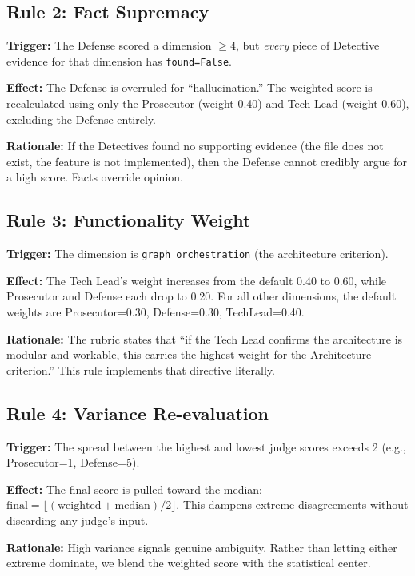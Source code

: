 \documentclass[12pt,a4paper]{article}
\begin{document}
\subsection{Rule 2: Fact Supremacy}

\textbf{Trigger:} The Defense scored a dimension $\geq 4$, but \emph{every} piece of Detective evidence for that dimension has \texttt{found=False}.

\textbf{Effect:} The Defense is overruled for ``hallucination.'' The weighted score is recalculated using only the Prosecutor (weight 0.40) and Tech Lead (weight 0.60), excluding the Defense entirely.

\textbf{Rationale:} If the Detectives found no supporting evidence (the file does not exist, the feature is not implemented), then the Defense cannot credibly argue for a high score. Facts override opinion.

\subsection{Rule 3: Functionality Weight}

\textbf{Trigger:} The dimension is \texttt{graph\_orchestration} (the architecture criterion).

\textbf{Effect:} The Tech Lead's weight increases from the default 0.40 to 0.60, while Prosecutor and Defense each drop to 0.20. For all other dimensions, the default weights are Prosecutor=0.30, Defense=0.30, TechLead=0.40.

\textbf{Rationale:} The rubric states that ``if the Tech Lead confirms the architecture is modular and workable, this carries the highest weight for the Architecture criterion.'' This rule implements that directive literally.

\subsection{Rule 4: Variance Re-evaluation}

\textbf{Trigger:} The spread between the highest and lowest judge scores exceeds 2 (e.g., Prosecutor=1, Defense=5).

\textbf{Effect:} The final score is pulled toward the median: $\text{final} = \lfloor(\text{weighted} + \text{median}) / 2\rfloor$. This dampens extreme disagreements without discarding any judge's input.

\textbf{Rationale:} High variance signals genuine ambiguity. Rather than letting either extreme dominate, we blend the weighted score with the statistical center.
\end{document}
